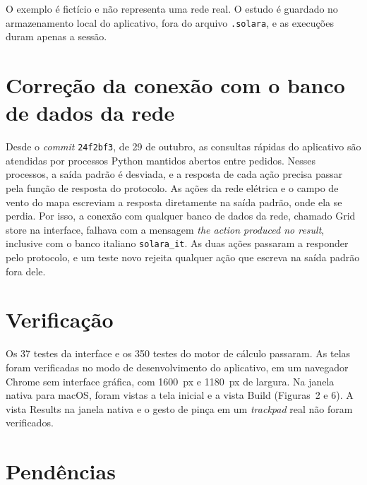 \documentclass[10pt,a4paper,oneside,onecolumn]{book}
\begin{document}
\begin{objecao}
O exemplo é fictício e não representa uma rede real. O estudo é guardado
no armazenamento local do aplicativo, fora do arquivo \texttt{.solara}, e
as execuções duram apenas a sessão.
\end{objecao}

\clearpage

\section*{Correção da conexão com o banco de dados da rede}

Desde o \emph{commit} \texttt{24f2bf3}, de 29 de outubro, as consultas
rápidas do aplicativo são atendidas por processos Python mantidos
abertos entre pedidos. Nesses processos, a saída padrão é desviada, e a
resposta de cada ação precisa passar pela função de resposta do
protocolo. As ações da rede elétrica e o campo de vento do mapa escreviam
a resposta diretamente na saída padrão, onde ela se perdia. Por isso, a
conexão com qualquer banco de dados da rede, chamado Grid store na
interface, falhava com a mensagem \emph{the action produced no result},
inclusive com o banco italiano \texttt{solara\_it}. As duas ações
passaram a responder pelo protocolo, e um teste novo rejeita qualquer
ação que escreva na saída padrão fora dele.

\section*{Verificação}

Os 37 testes da interface e os 350 testes do motor de cálculo passaram.
As telas foram verificadas no modo de desenvolvimento do aplicativo, em
um navegador Chrome sem interface gráfica, com \num{1600}~px e
\num{1180}~px de largura. Na janela nativa para macOS, foram vistas a
tela inicial e a vista Build (Figuras~2 e 6). A vista Results na janela
nativa e o gesto de pinça em um \emph{trackpad} real não foram
verificados.

\section*{Pendências}
\end{document}
